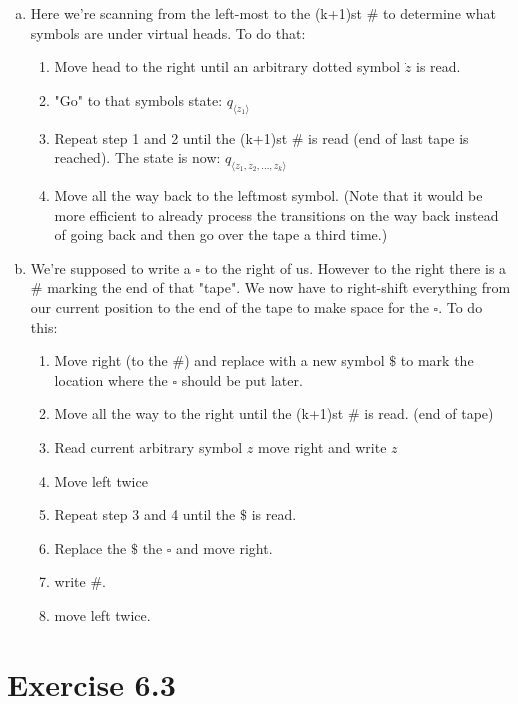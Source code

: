 \documentclass{article} %
\newcommand{\homeworkNumber}{6}
\begin{document}
\begin{enumerate}[(a)]
\item
Here we're scanning from the left-most to the (k+1)st $\#$ to determine what symbols are under virtual heads. To do that:
\begin{enumerate}[1.]
\item Move head to the right until an arbitrary dotted symbol $\dot{z}$ is read.
\item "Go" to that symbols state: $q_{\langle z_1 \rangle}$
\item Repeat step 1 and 2 until the (k+1)st $\#$ is read (end of last tape is reached). The state is now: $q_{\langle z_1, z_2, \dots, z_k \rangle}$
\item Move all the way back to the leftmost symbol. (Note that it would be more efficient to already process the transitions on the way back instead of going back and then go over the tape a third time.)
\end{enumerate}
\clearpage
\item
We're supposed to write a $\square$ to the right of us. However to the right there is a $\#$ marking the end of that "tape". We now have to right-shift everything from our current position to the end of the tape to make space for the $\square$. To do this:
\begin{enumerate}[1.]
\item Move right (to the $\#$) and replace with a new symbol $\$$ to mark the location where the $\square$ should be put later.
\item Move all the way to the right until the (k+1)st $\#$ is read. (end of tape)
\item Read current arbitrary symbol $z$ move right and write $z$
\item Move left twice
\item Repeat step 3 and 4 until the $\$$ is read.
\item Replace the $\$$ the $\square$ and move right.
\item write $\#$.
\item move left twice.
\end{enumerate}

\end{enumerate}

\clearpage




\section*{Exercise \homeworkNumber.3}
\clearpage
\end{document}
